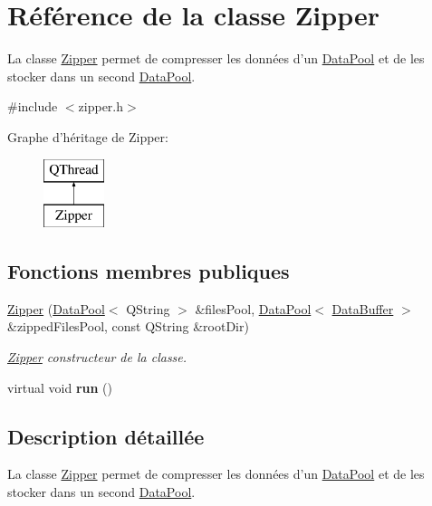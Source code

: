 \hypertarget{class_zipper}{\section{Référence de la classe Zipper}
\label{class_zipper}
}


La classe \hyperlink{class_zipper}{Zipper} permet de compresser les données d'un \hyperlink{class_data_pool}{Data\+Pool} et de les stocker dans un second \hyperlink{class_data_pool}{Data\+Pool}.  




{\ttfamily \#include $<$zipper.\+h$>$}

Graphe d'héritage de Zipper\+:\begin{figure}[H]
\begin{center}
\leavevmode
\includegraphics[height=2.000000cm]{class_zipper}
\end{center}
\end{figure}
\subsection*{Fonctions membres publiques}
\begin{DoxyCompactItemize}
\item 
\hyperlink{class_zipper_a42f9dfaa2fdf20d730c1dd5a29185353}{Zipper} (\hyperlink{class_data_pool}{Data\+Pool}$<$ Q\+String $>$ \&files\+Pool, \hyperlink{class_data_pool}{Data\+Pool}$<$ \hyperlink{class_data_buffer}{Data\+Buffer} $>$ \&zipped\+Files\+Pool, const Q\+String \&root\+Dir)
\begin{DoxyCompactList}\small\item\em \hyperlink{class_zipper}{Zipper} constructeur de la classe. \end{DoxyCompactList}\item 
\hypertarget{class_zipper_a17e7eb33d4588234dc47d24cbd0d6c09}{virtual void {\bfseries run} ()}\label{class_zipper_a17e7eb33d4588234dc47d24cbd0d6c09}

\end{DoxyCompactItemize}


\subsection{Description détaillée}
La classe \hyperlink{class_zipper}{Zipper} permet de compresser les données d'un \hyperlink{class_data_pool}{Data\+Pool} et de les stocker dans un second \hyperlink{class_data_pool}{Data\+Pool}. 

